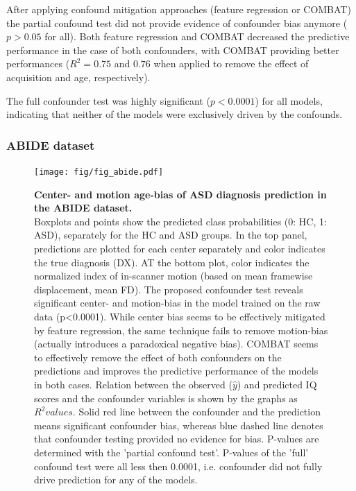\documentclass{article}
\begin{document}
After applying confound mitigation approaches (feature regression or COMBAT) the partial confound test did not provide evidence of confounder bias anymore ($p > 0.05$ for all). Both feature regression and COMBAT decreased the predictive performance in the case of both confounders, with COMBAT providing better performances ($R^2=0.75$ and $0.76$ when applied to remove the effect of acquisition and age, respectively).

The full confounder test was highly significant ($p<0.0001$) for all models, indicating that neither of the models were exclusively driven by the confounds.

\subsubsection*{ABIDE dataset}

\begin{figure}[!b]
  \centering
  \texttt{[image: fig/fig\_abide.pdf]}
  \caption{\textbf{Center- and motion age-bias of ASD diagnosis prediction in the ABIDE dataset.} \\
  Boxplots and points show the predicted class probabilities (0: HC, 1: ASD), separately for the HC and ASD groups. In the top panel, predictions are plotted for each center separately and color indicates the true diagnosis (DX). AT the bottom plot, color indicates the normalized index of in-scanner motion (based on mean framewise displacement, mean FD). The proposed confounder test reveals significant center- and motion-bias in the model trained on the raw data (p<0.0001). While center bias seems to be effectively mitigated by feature regression, the same technique fails to remove motion-bias (actually introduces a paradoxical negative bias). COMBAT seems to effectively remove the effect of both confounders on the predictions and improves the predictive performance of the models in both cases.
  Relation between the observed ($\hat{y}$) and predicted IQ scores and the confounder variables is shown by the graphs as $R^2 values$. Solid red line between the confounder and the prediction means significant confounder bias, whereas blue dashed line denotes that confounder testing provided no evidence for bias. P-values are determined with the 'partial confound test'. P-values of the 'full' confound test were all less then 0.0001, i.e. confounder did not fully drive prediction for any of the models.
  }
  \label{fig:abide}
\end{figure}
\end{document}
